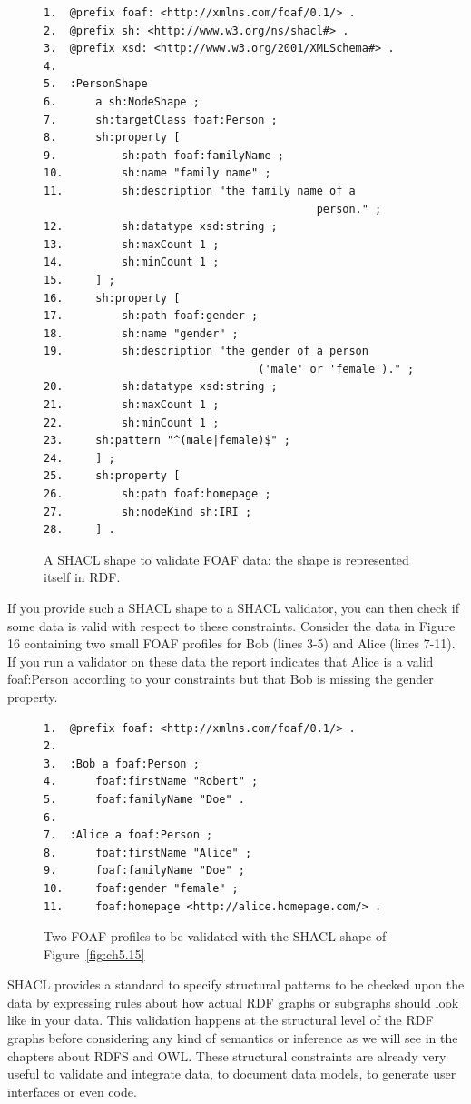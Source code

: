 \begin{figure}
\begin{lstlisting}
1.	@prefix foaf: <http://xmlns.com/foaf/0.1/> .
2.	@prefix sh: <http://www.w3.org/ns/shacl#> .
3.	@prefix xsd: <http://www.w3.org/2001/XMLSchema#> .
4.	
5.	:PersonShape
6.	    a sh:NodeShape ;
7.	    sh:targetClass foaf:Person ;
8.	    sh:property [
9.	        sh:path foaf:familyName ;
10.	        sh:name "family name" ;
11.	        sh:description "the family name of a 
                                          person." ;
12.	        sh:datatype xsd:string ;
13.	        sh:maxCount 1 ;
14.	        sh:minCount 1 ;
15.	    ] ;
16.	    sh:property [
17.	        sh:path foaf:gender ;
18.	        sh:name "gender" ;
19.	        sh:description "the gender of a person 
                                 ('male' or 'female')." ;
20.	        sh:datatype xsd:string ;
21.	        sh:maxCount 1 ;
22.	        sh:minCount 1 ;
23.		sh:pattern "^(male|female)$" ;
24.	    ] ;
25.		sh:property [                
26.			sh:path foaf:homepage ;
27.			sh:nodeKind sh:IRI ;
28.		] .
\end{lstlisting}
\label{fig:5.15}
\caption{A SHACL shape to validate FOAF data: the shape is represented
itself in RDF.}
\end{figure}


If you provide such a SHACL shape to a SHACL validator, you can then
check if some data is valid with respect to these constraints. Consider
the data in Figure 16 containing two small FOAF profiles for Bob (lines
3-5) and Alice (lines 7-11). If you run a validator on these data the
report indicates that Alice is a valid foaf:Person according to your
constraints but that Bob is missing the gender property.

\begin{figure}
\begin{lstlisting}
1.	@prefix foaf: <http://xmlns.com/foaf/0.1/> .
2.	
3.	:Bob a foaf:Person ;
4.	    foaf:firstName "Robert" ;
5.	    foaf:familyName "Doe" .
6.	
7.	:Alice a foaf:Person ;
8.	    foaf:firstName "Alice" ;
9.	    foaf:familyName "Doe" ;
10.	    foaf:gender "female" ;
11.	    foaf:homepage <http://alice.homepage.com/> .
\end{lstlisting}
\label{fig:5.16}
\caption{Two FOAF profiles to be validated with the SHACL shape of Figure~\ref{fig:ch5.15}}
\end{figure}



SHACL provides a standard to specify structural patterns to be checked
upon the data by expressing rules about how actual RDF graphs or
subgraphs should look like in your data. This validation happens at the
structural level of the RDF graphs before considering any kind of
semantics or inference as we will see in the chapters about RDFS and
OWL. These structural constraints are already very useful to validate
and integrate data, to document data models, to generate user interfaces
or even code.

